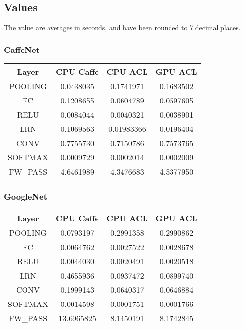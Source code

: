 \documentclass[12pt, a4paper, notitlepage]{report}
\begin{document}
\subsection*{Values}
The value are averages in seconds, and have been rounded to 7 decimal places.
\subsubsection{CaffeNet}
\begin{center}
\begin{tabular}{ | c | c | c | c |}
\hline
Layer & CPU Caffe & CPU ACL & GPU ACL \\
\hline
POOLING & 0.0438035 & 0.1741971 & 0.1683502 \\
\hline
FC & 0.1208655 & 0.0604789 & 0.0597605 \\
\hline
RELU & 0.0084044 & 0.0040321 & 0.0038901 \\
\hline
LRN & 0.1069563 & 0.01983366 & 0.0196404 \\
\hline
CONV & 0.7755730 & 0.7150786 & 0.7573765 \\
\hline
SOFTMAX & 0.0009729 & 0.0002014 & 0.0002009 \\
\hline
\hline
FW\_PASS & 4.6461989 & 4.3476683 & 4.5377950 \\
\hline
\end{tabular}
\end{center}

\subsubsection{GoogleNet}
\begin{center}
\begin{tabular}{ | c | c | c | c |}
\hline
Layer & CPU Caffe & CPU ACL & GPU ACL \\
\hline
POOLING & 0.0793197 & 0.2991358 & 0.2990862 \\
\hline
FC & 0.0064762 & 0.0027522 & 0.0028678 \\
\hline
RELU & 0.0044030 & 0.0020491 & 0.0020518 \\
\hline
LRN & 0.4655936 & 0.0937472 & 0.0899740 \\
\hline
CONV & 0.1999143 & 0.0640317 & 0.0646884 \\
\hline
SOFTMAX & 0.0014598 & 0.0001751 & 0.0001766 \\
\hline
\hline
FW\_PASS & 13.6965825 & 8.1450191 & 8.1742845 \\
\hline
\end{tabular}
\end{center}
\end{document}
